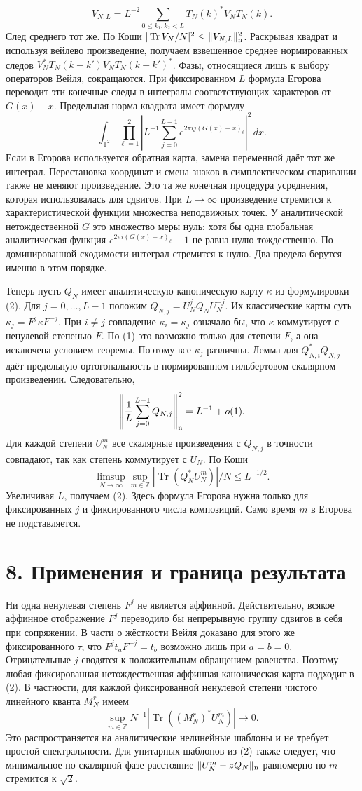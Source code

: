 \documentclass[11pt,a4paper]{article}
\newcommand{\Tr}{\operatorname{Tr}}
\newcommand{\Z}{\mathbb Z}
\newcommand{\sect}[1]{\section*{\sffamily\color{ink}#1}}
\newcommand{\T}{\mathbb T}
\begin{document}
\[
       V_{N,L}=L^{-2}\sum_{0\le k_1,k_2<L}
                                 T_N(k)^*V_N T_N(k).
\]
След среднего тот же. По Коши $|\Tr V_N/N|^2\le\|V_{N,L}\|_{\rm n}^2$. Раскрывая квадрат и используя вейлево произведение, получаем взвешенное среднее нормированных следов $V_N^*T_N(k-k')V_N T_N(k-k')^*$. Фазы, относящиеся лишь к выбору операторов Вейля, сокращаются. При фиксированном $L$ формула Егорова переводит эти конечные следы в интегралы соответствующих характеров от $G(x)-x$. Предельная норма квадрата имеет формулу
\[
 \int_{\T^2}
      \prod_{\ell=1}^2
        \left|L^{-1}\sum_{j=0}^{L-1}
                 e^{2\pi i j(G(x)-x)_\ell}\right|^2\,dx .
\]
Если в Егорова используется обратная карта, замена переменной даёт тот же интеграл. Перестановка координат и смена знаков в симплектическом спаривании также не меняют произведение. Это та же конечная процедура усреднения, которая использовалась для сдвигов. При $L\to\infty$ произведение стремится к характеристической функции множества неподвижных точек. У аналитической нетождественной $G$ это множество меры нуль: хотя бы одна глобальная аналитическая функция $e^{2\pi i(G(x)-x)_\ell}-1$ не равна нулю тождественно. По доминированной сходимости интеграл стремится к нулю. Два предела берутся именно в этом порядке.

Теперь пусть $Q_N$ имеет аналитическую каноническую карту $\kappa$ из формулировки (2). Для $j=0,\ldots,L-1$ положим $Q_{N,j}=U_N^j Q_N U_N^{-j}$. Их классические карты суть $\kappa_j=F^j\kappa F^{-j}$. При $i\ne j$ совпадение $\kappa_i=\kappa_j$ означало бы, что $\kappa$ коммутирует с ненулевой степенью $F$. По (1) это возможно только для степени $F$, а она исключена условием теоремы. Поэтому все $\kappa_j$ различны. Лемма для $Q_{N,i}^*Q_{N,j}$ даёт предельную ортогональность в нормированном гильбертовом скалярном произведении. Следовательно,
\[
           \left\|\frac1L\sum_{j=0}^{L-1}Q_{N,j}\right\|_{\rm n}^2
                                                    =L^{-1}+o(1).
\]
Для каждой степени $U_N^m$ все скалярные произведения с $Q_{N,j}$ в точности совпадают, так как степень коммутирует с $U_N$. По Коши
\[
       \limsup_{N\to\infty}\sup_{m\in\Z}
            |\Tr(Q_N^*U_N^m)|/N\le L^{-1/2}.
\]
Увеличивая $L$, получаем (2). Здесь формула Егорова нужна только для фиксированных $j$ и фиксированного числа композиций. Само время $m$ в Егорова не подставляется.
\newpage
\sect{8. Применения и граница результата}
Ни одна ненулевая степень $F^j$ не является аффинной. Действительно, всякое аффинное отображение $F^j$ переводило бы непрерывную группу сдвигов в себя при сопряжении. В части о жёсткости Вейля доказано для этого же фиксированного $\tau$, что $F^j t_a F^{-j}=t_b$ возможно лишь при $a=b=0$. Отрицательные $j$ сводятся к положительным обращением равенства. Поэтому любая фиксированная нетождественная аффинная каноническая карта подходит в (2). В частности, для каждой фиксированной ненулевой степени чистого линейного кванта $M_N^r$ имеем
\[
           \sup_{m\in\Z}N^{-1}|\Tr((M_N^r)^*U_N^m)|\longrightarrow0.
\]
Это распространяется на аналитические нелинейные шаблоны и не требует простой спектральности. Для унитарных шаблонов из (2) также следует, что минимальное по скалярной фазе расстояние $\|U_N^m-zQ_N\|_{\rm n}$ равномерно по $m$ стремится к $\sqrt2$.
\end{document}
